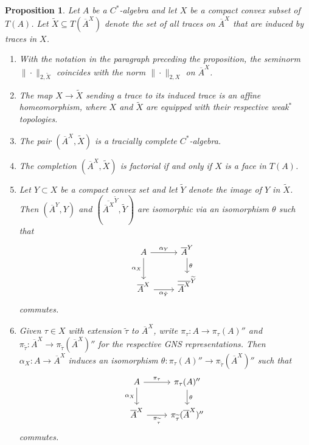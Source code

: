 \documentclass[a4paper,11pt]{amsart}
\newtheorem{proposition}[theorem]{Proposition}
\theoremstyle{definition}
\numberwithin{equation}{section}
\numberwithin{theorem}{section}
\newcommand{\completion}[2]{\overline{#1}^{#2}}
\begin{document}
\begin{proposition}\label{prop:tracial-completion}
	Let $A$ be a $C^*$-algebra and let $X$ be a compact convex subset of $T(A)$.
	Let $\widetilde{X} \subseteq T(\completion{A}{X})$ denote the set of all traces on $\completion{A}{X}$ that are induced by traces in $X$.
	\begin{enumerate}
		\item\label{item:completion-norm} With the notation in the paragraph preceding the proposition, the seminorm $\|\cdot\|_{2,\widetilde{X}}$ coincides with the norm $\|\cdot\|_{2,X}$ on $\completion{A}{X}$.
		\item\label{item:completion-trace} The map $X\rightarrow \widetilde{X}$ sending a trace to its induced trace is an affine homeomorphism, where $X$ and $\widetilde{X}$ are equipped with their respective weak$^*$ topologies.
		\item\label{item:completion-complete} The pair $(\completion{A}{X}, \widetilde{X})$ is a tracially complete $C^*$-algebra.
		\item\label{item:completion-factorial} The completion
		$(\completion{A}{X}, \widetilde{X})$ is factorial if and only if $X$ is a face in $T(A)$.
  \item\label{item:completion-subset} Let $Y\subset X$ be a compact convex set and let $\widetilde{Y}$ denote the image of $Y$ in $\tilde{X}$.  Then $(\completion{A}{Y},Y)$ and $(\completion{\completion{A}{X}}{\widetilde{Y}},\widetilde{Y})$ are isomorphic via an isomorphism $\theta$ such that
  \begin{equation}\label{eqn:completion-subset}
      \begin{tikzcd}          A\ar[r,"\alpha_Y"]\ar[d,swap,"\alpha_X"]&\completion{A}{Y}\ar[d,"\theta"]\\\completion{A}{X}\ar[r,swap,"\alpha_{\tilde{Y}}"]&\completion{\completion{A}{X}}{\widetilde{Y}}
      \end{tikzcd}
  \end{equation}
  commutes. 
  \item \label{item:completion-fibres} Given $\tau\in X$ with extension $\widetilde{\tau}$ to $\completion{A}{X}$, write $\pi_\tau\colon A\to \pi_\tau(A)''$ 
  and 
  $\pi_{\widetilde{\tau}}\colon \completion{A}{X}\to\pi_{\widetilde{\tau}}(\completion{A}{X})''$ for the respective GNS representations.  Then $\alpha_X\colon A\to \completion{A}{X}$ induces an isomorphism $\theta\colon\pi_\tau(A)''\to\pi_{\widetilde{\tau}}(\completion{A}{X})''$ such that
  \begin{equation}
      \begin{tikzcd}          A\ar[r,"\pi_\tau"]\ar[d,swap,"\alpha_X"]&\pi_\tau(A)''\ar[d,"\theta"]\\\completion{A}{X}\ar[r,swap,"\pi_{\widetilde{\tau}}"]&\pi_{\widetilde{\tau}}(\completion{A}{X})''
      \end{tikzcd}
  \end{equation}
  commutes.
	\end{enumerate}	
\end{proposition}
\end{document}
